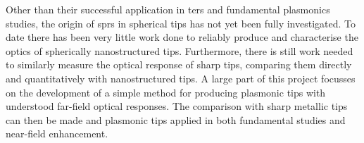 \documentclass{article}
\begin{document}
Other than their successful application in \gls{ters} and fundamental plasmonics studies, the origin of \glspl{spr} in spherical tips has not yet been fully investigated. To date there has been very little work done to reliably produce and characterise the optics of spherically nanostructured tips. Furthermore, there is still work needed to similarly measure the optical response of sharp tips, comparing them directly and quantitatively with nanostructured tips. A large part of this project focusses on the development of a simple method for producing plasmonic tips with understood far-field optical responses. The comparison with sharp metallic tips can then be made and plasmonic tips applied in both fundamental studies and near-field enhancement.
\end{document}
